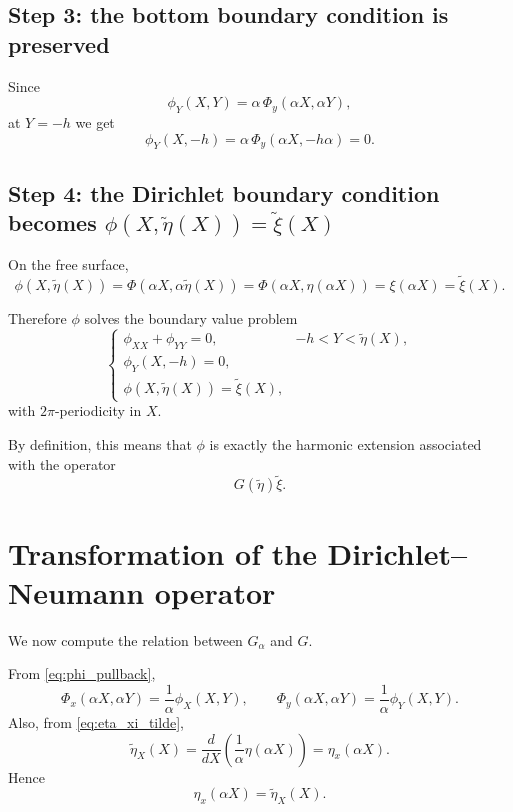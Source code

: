 \documentclass[11pt]{article}
\begin{document}
\subsection*{Step 3: the bottom boundary condition is preserved}

Since
\[
\phi_Y(X,Y)=\alpha\,\Phi_y(\alpha X,\alpha Y),
\]
at $Y=-h$ we get
\[
\phi_Y(X,-h)=\alpha\,\Phi_y(\alpha X,-h\alpha)=0.
\]

\subsection*{Step 4: the Dirichlet boundary condition becomes $\phi(X,\widetilde{\eta}(X))=\widetilde{\xi}(X)$}

On the free surface,
\[
\phi(X,\widetilde{\eta}(X))
=
\Phi(\alpha X,\alpha \widetilde{\eta}(X))
=
\Phi(\alpha X,\eta(\alpha X))
=
\xi(\alpha X)
=
\widetilde{\xi}(X).
\]

Therefore $\phi$ solves the boundary value problem
\begin{equation}
\begin{cases}
\phi_{XX}+\phi_{YY}=0, & -h<Y<\widetilde{\eta}(X),\\[0.3em]
\phi_Y(X,-h)=0,\\[0.3em]
\phi(X,\widetilde{\eta}(X))=\widetilde{\xi}(X),
\end{cases}
\label{eq:transformed_bvp}
\end{equation}
with $2\pi$-periodicity in $X$.

By definition, this means that $\phi$ is exactly the harmonic extension associated with the operator
\[
G(\widetilde{\eta})\widetilde{\xi}.
\]

\section{Transformation of the Dirichlet--Neumann operator}

We now compute the relation between $G_\alpha$ and $G$.

From \eqref{eq:phi_pullback},
\[
\Phi_x(\alpha X,\alpha Y)=\frac{1}{\alpha}\phi_X(X,Y),
\qquad
\Phi_y(\alpha X,\alpha Y)=\frac{1}{\alpha}\phi_Y(X,Y).
\]
Also, from \eqref{eq:eta_xi_tilde},
\[
\widetilde{\eta}_X(X)
=
\frac{d}{dX}\left( \frac{1}{\alpha}\eta(\alpha X)\right)
=
\eta_x(\alpha X).
\]
Hence
\[
\eta_x(\alpha X)=\widetilde{\eta}_X(X).
\]
\end{document}
